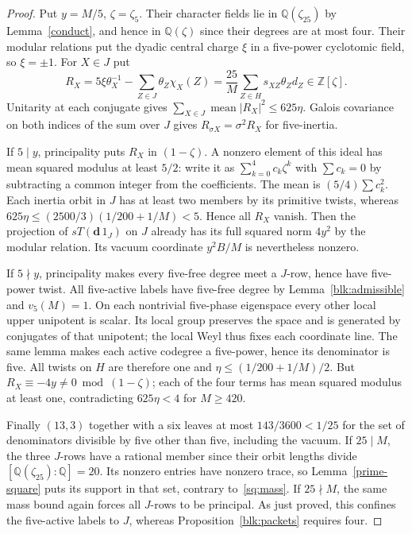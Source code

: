 \documentclass[11pt]{amsart}
\numberwithin{equation}{section}
\begin{document}
\begin{proof}
Put $y=M/5$, $\zeta=\zeta_5$. Their character fields lie in $\mathbb Q(\zeta_{25})$ by Lemma~\ref{conduct}, and hence in $\mathbb Q(\zeta)$ since their degrees are at most four. Their modular relations put the dyadic central charge $\xi$ in a five-power cyclotomic field, so $\xi=\pm1$. For $X\in J$ put
\[
 R_X=5\xi\theta_X^{-1}-\sum_{Z\in J}\theta_Z\chi_X(Z)
    =\frac{25}{M}\sum_{Z\in H}s_{XZ}\theta_Zd_Z\in\mathbb Z[\zeta].
\]
Unitarity at each conjugate gives $\sum_{X\in J}\operatorname{mean}|R_X|^2\le625\eta$. Galois covariance on both indices of the sum over $J$ gives $R_{\sigma X}=\sigma^2R_X$ for five-inertia.

If $5\mid y$, principality puts $R_X$ in $(1-\zeta)$. A nonzero element of this ideal has mean squared modulus at least $5/2$: write it as $\sum_{k=0}^4c_k\zeta^k$ with $\sum c_k=0$ by subtracting a common integer from the coefficients. The mean is $(5/4)\sum c_k^2$. Each inertia orbit in $J$ has at least two members by its primitive twists, whereas $625\eta\le(2500/3)(1/200+1/M)<5$. Hence all $R_X$ vanish. Then the projection of $sT(\mathbf d\,1_J)$ on $J$ already has its full squared norm $4y^2$ by the modular relation. Its vacuum coordinate $y^2B/M$ is nevertheless nonzero.

If $5\nmid y$, principality makes every five-free degree meet a $J$-row, hence have five-power twist. All five-active labels have five-free degree by Lemma~\ref{blk:admissible} and $v_5(M)=1$. On each nontrivial five-phase eigenspace every other local upper unipotent is scalar. Its local group preserves the space and is generated by conjugates of that unipotent; the local Weyl thus fixes each coordinate line. The same lemma makes each active codegree a five-power, hence its denominator is five. All twists on $H$ are therefore one and $\eta\le(1/200+1/M)/2$. But $R_X\equiv-4y\ne0\bmod(1-\zeta)$; each of the four terms has mean squared modulus at least one, contradicting $625\eta<4$ for $M\ge420$.

Finally $(13,3)$ together with a six leaves at most $143/3600<1/25$ for the set of denominators divisible by five other than five, including the vacuum. If $25\mid M$, the three $J$-rows have a rational member since their orbit lengths divide $[\mathbb Q(\zeta_{25}):\mathbb Q]=20$. Its nonzero entries have nonzero trace, so Lemma~\ref{prime-square} puts its support in that set, contrary to~\eqref{sq:mass}. If $25\nmid M$, the same mass bound again forces all $J$-rows to be principal. As just proved, this confines the five-active labels to $J$, whereas Proposition~\ref{blk:packets} requires four.
\end{proof}
\end{document}
